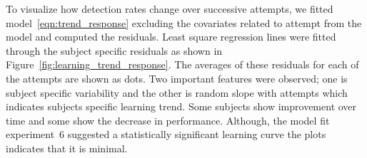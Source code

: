 \documentclass[10pt]{article}\usepackage[]{graphicx}\usepackage[]{xcolor}
\begin{document}
% 
% 
% 
% 


To visualize how  detection rates change over successive attempts, we fitted model~\eqref{eqn:trend_response} excluding the covariates related to attempt from the model and computed the residuals. Least square regression lines were fitted through the subject specific residuals as shown in Figure~\ref{fig:learning_trend_response}. The averages of these residuals for each of the attempts are shown as dots. Two important features were observed; one is subject specific variability and the other is random slope with attempts which indicates subjects specific learning trend. Some subjects show improvement over time and some show the decrease in performance. Although, the model fit experiment~6 suggested a statistically significant learning curve the plots indicates that it is minimal. 
\end{document}
